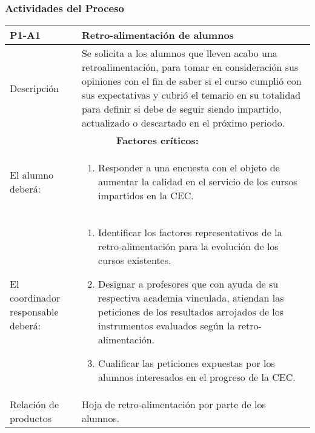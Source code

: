 \subsubsection{Actividades del Proceso}		%
\begin{table}[H]
\centering
	\begin{tabular}{p{3.5cm} p{12.5cm}}
		\hline\hline
			\rowcolor{LightBlue2} \textbf{P1-A1} & \textbf{Retro-alimentación de alumnos}\\
		\hline\hline
			Descripción & Se solicita a los alumnos que lleven acabo una retroalimentación, para tomar en consideración sus opiniones con el fin de saber si el curso cumplió con sus expectativas y cubrió el temario en su totalidad para definir si debe de seguir siendo impartido, actualizado o descartado en el próximo periodo.\\	
		\hline	\hline		
			\multicolumn{2}{|c|}{\textbf{Factores críticos:}}\\
		\hline\hline
			{El alumno deberá:}&
			\begin{enumerate}
				\item Responder a una encuesta con el objeto de aumentar la calidad en el servicio de los cursos impartidos en la CEC.
			\end{enumerate}\\
			{El coordinador responsable deberá:}&
			\begin{enumerate}
				\item Identificar los factores representativos de la retro-alimentación para la evolución de los cursos existentes.
				\item Designar a profesores que con ayuda de su respectiva academia vinculada, atiendan las peticiones de los resultados arrojados de los instrumentos evaluados según la retro-alimentación.
				\item Cualificar las peticiones expuestas por los alumnos interesados en el progreso de la CEC.
			\end{enumerate}\\
		\hline
			Relación de productos & Hoja de retro-alimentación por parte de los alumnos.\\
		\hline
	\end{tabular}
\end{table}


